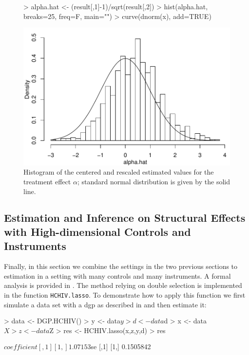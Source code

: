 \documentclass{amsart}
\begin{document}
\begin{figure}[h!]
\begin{center}
\label{IV}
\begin{Schunk}
\begin{Sinput}
> alpha.hat <- (result[,1]-1)/sqrt(result[,2])
> hist(alpha.hat, breaks=25, freq=F, main="")
> curve(dnorm(x), add=TRUE)
\end{Sinput}
\end{Schunk}
\includegraphics{HDM-IV}
\end{center}
\caption{Histogram of the centered and rescaled estimated values for the treatment effect $\alpha$; standard normal distribution is given by the solid line.}
\end{figure}

\subsection{Estimation and Inference on Structural Effects with High-dimensional Controls and Instruments}
Finally, in this section we combine the settings in the two previous sections to estimation in a setting with many controls and many instruments. A formal analysis is provided in \cite{CHS:2015}. The method relying on double selection is implemented in the function \texttt{HCHIV.lasso}.
To demonstrate how to apply this function we first simulate a data set with a dgp as described in  \cite{CHS:2015} and then estimate it:

\begin{Schunk}
\begin{Sinput}
>  data <- DGP.HCHIV()
>   y <- data$y
>   d <- data$d
>   x <- data$X
>   z <- data$Z
>   res <- HCHIV.lasso(x,z,y,d)
>   res
\end{Sinput}
\begin{Soutput}
$coefficient
        [,1]
[1,] 1.07153

$se
          [,1]
[1,] 0.1505842
\end{Soutput}
\end{Schunk}
\end{document}
